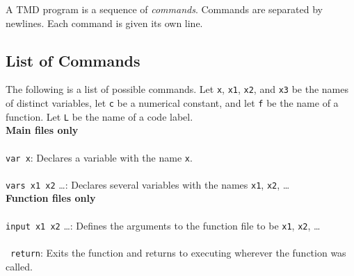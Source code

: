 \documentclass[11pt]{report}
\begin{document}
A TMD program is a sequence of \emph{commands}. Commands are separated by newlines. Each command is given its own line. \\

\subsection{List of Commands}

The following is a list of possible commands. Let \texttt{x}, \texttt{x1}, \texttt{x2}, and \texttt{x3} be the names of distinct variables, let \texttt{c} be a numerical constant, and let \texttt{f} be the name of a function. Let \texttt{L} be the name of a code label. \\

\textbf{Main files only} \\ \\
\texttt{var x}: Declares a variable with the name \texttt{x}. \\ \\
\texttt{vars x1 x2} \dots: Declares several variables with the names \texttt{x1}, \texttt{x2}, \dots \\

\textbf{Function files only} \\ \\
\texttt{input x1 x2} \dots: Defines the arguments to the function file to be \texttt{x1}, \texttt{x2}, \dots \\ \\\
\texttt{return}: Exits the function and returns to executing wherever the function was called. \\
\end{document}
